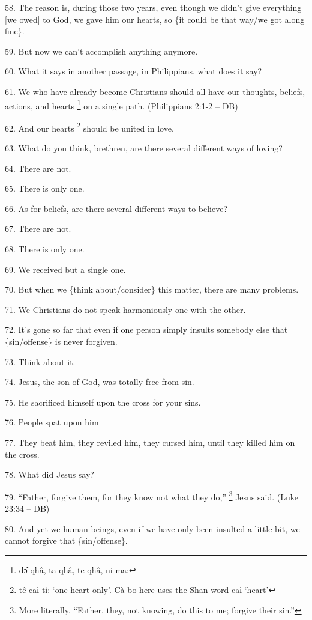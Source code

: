 58. The reason is, during those two years, even though we didn't give everything
[we owed] to God, we gave him our hearts, so \{it could be that way/we got along
fine\}.

59. But now we can't accomplish anything anymore.

60. What it says in another passage, in Philippians, what does it say?

61. We who have already become Christians should all have our thoughts, beliefs,
actions, and hearts \footnote{dɔ̂-qhâ, tā-qhâ, te-qhâ, ni-ma:} on a single path. (Philippians 2:1-2 -- DB)

62. And our hearts \footnote{tê caɨ tí: `one heart only'. Cà-bo here uses the Shan word caɨ `heart'} should be united in love.

63. What do you think, brethren, are there several different ways of loving?

64. There are not.

65. There is only one.

66. As for beliefs, are there several different ways to believe?

67. There are not.

68. There is only one.

69. We received but a single one.

70. But when we \{think about/consider\} this matter, there are many problems.

71. We Christians do not speak harmoniously one with the other.

72. It's gone so far that even if one person simply insults somebody else that
\{sin/offense\} is never forgiven.

73. Think about it.

74. Jesus, the son of God, was totally free from sin.

75. He sacrificed himself upon the cross for your sins.

76. People spat upon him

77. They beat him, they reviled him, they cursed him, until they killed him on
the cross.

78. What did Jesus say?

79. ``Father, forgive them, for they know not what they do,'' \footnote{More literally, ``Father, they, not knowing, do this to me; forgive their sin.''} Jesus said. (Luke
23:34 -- DB)

80. And yet we human beings, even if we have only been insulted a little bit, we
cannot forgive that \{sin/offense\}.

